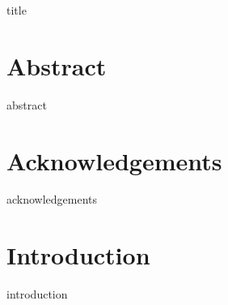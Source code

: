 \documentclass[a4paper,12pt]{report}
\begin{document}
{title}


\normalsize

\chapter*{Abstract}
{abstract}

\chapter*{Acknowledgements}
{acknowledgements}

\tableofcontents

\cleardoublepage
{}
{}
\listoffigures

\cleardoublepage
{}
{}
\listoftables


\chapter{Introduction}
{introduction}

\printbibliography[
    heading=bibintoc,
    title={Bibliography}]
\end{document}
